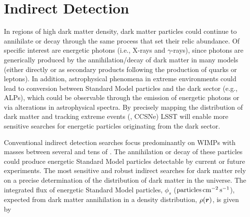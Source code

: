 \section{Indirect Detection }
  

In regions of high dark matter density, dark matter particles could continue to annihilate or decay through the same process that set their relic abundance.
Of specific interest are energetic photons (i.e., X-rays and $\gamma$-rays), since photons are generically produced by the annihilation/decay of dark matter in many models (either directly or as secondary products following the production of quarks or leptons). In addition, astrophysical phenomena in extreme environments could lead to conversion between Standard Model particles and the dark sector (e.g., ALPs), which could be observable through the emission of energetic photons or via alterations in astrophysical spectra.
By precisely mapping the distribution of dark matter and tracking extreme events (\eg, CCSNe) LSST will enable more sensitive searches for energetic particles originating from the dark sector.

Conventional indirect detection searches focus predominantly on WIMPs with masses between several \GeV and tens of \TeV. 
The annihilation or decay of these particles could produce energetic Standard Model particles detectable by current or future experiments.
The most sensitive and robust indirect searches for dark matter rely on a precise determination of the distribution of dark matter in the universe.
The integrated flux of energetic Standard Model particles, $\phi_s$ (${\rm particles} \mathrm{\,cm}^{-2} \mathrm{\,s}^{-1}$), expected from dark matter annihilation in a density distribution, $\rho(\boldsymbol{r})$, is given by


